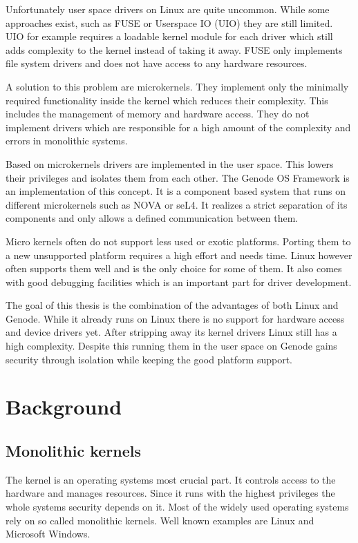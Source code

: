 \documentclass[
a4paper,
12pt,
notitlepage,
parskip=half,
DIV=11,
]{scrbook}
\begin{document}
		Unfortunately user space drivers on Linux are quite uncommon.
		While some approaches exist, such as FUSE \citep{fuse} or Userspace IO (UIO) \citep{uio} they are still limited.
		UIO for example requires a loadable kernel module for each driver which still adds complexity to the kernel instead of taking it away.
		FUSE only implements file system drivers and does not have access to any hardware resources.
		
		A solution to this problem are microkernels.
		They implement only the minimally required functionality inside the kernel which reduces their complexity.
		This includes the management of memory and hardware access.
		They do not implement drivers which are responsible for a high amount of the complexity and errors in monolithic systems. \citep{Chou:SOSP:01}
		
		Based on microkernels drivers are implemented in the user space.
		This lowers their privileges and isolates them from each other.
		The Genode OS Framework is an implementation of this concept. 
		It is a component based system that runs on different microkernels such as NOVA or seL4.
		It realizes a strict separation of its components and only allows a defined communication between them.
		
		Micro kernels often do not support less used or exotic platforms.
		Porting them to a new unsupported platform requires a high effort and needs time.
		Linux however often supports them well and is the only choice for some of them.
		It also comes with good debugging facilities which is an important part for driver development.
		
		The goal of this thesis is the combination of the advantages of both Linux and Genode.
		While it already runs on Linux there is no support for hardware access and device drivers yet.
		After stripping away its kernel drivers Linux still has a high complexity.
		Despite this running them in the user space on Genode gains security through isolation while keeping the good platform support.
		
	\chapter{Background}

		\section{Monolithic kernels}
		
		The kernel is an operating systems most crucial part.
		It controls access to the hardware and manages resources.
		Since it runs with the highest privileges the whole systems security depends on it.
		Most of the widely used operating systems rely on so called monolithic kernels.
		Well known examples are Linux and Microsoft Windows.
		
\end{document}
